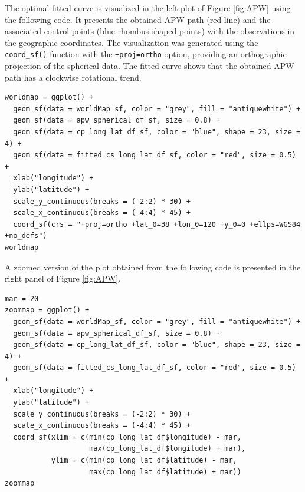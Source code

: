 The optimal fitted curve is visualized in the left plot of Figure \ref{fig:APW} using the following code. It presents the obtained APW path (red line) and the associated control points (blue rhombus-shaped points) with the observations in the geographic coordinates.
The visualization was generated using the \texttt{coord\_sf()} function with the \texttt{+proj=ortho} option, providing an orthographic projection of the spherical data.
The fitted curve shows that the obtained APW path has a clockwise rotational trend.

\begin{verbatim}
worldmap = ggplot() +
  geom_sf(data = worldMap_sf, color = "grey", fill = "antiquewhite") +
  geom_sf(data = apw_spherical_df_sf, size = 0.8) +
  geom_sf(data = cp_long_lat_df_sf, color = "blue", shape = 23, size = 4) +
  geom_sf(data = fitted_cs_long_lat_df_sf, color = "red", size = 0.5) +
  xlab("longitude") +
  ylab("latitude") +
  scale_y_continuous(breaks = (-2:2) * 30) +
  scale_x_continuous(breaks = (-4:4) * 45) +
  coord_sf(crs = "+proj=ortho +lat_0=38 +lon_0=120 +y_0=0 +ellps=WGS84 +no_defs")
worldmap
\end{verbatim}

A zoomed version of the plot obtained from the following code is presented in the right panel of Figure \ref{fig:APW}.

\begin{verbatim}
mar = 20
zoommap = ggplot() +
  geom_sf(data = worldMap_sf, color = "grey", fill = "antiquewhite") +
  geom_sf(data = apw_spherical_df_sf, size = 0.8) +
  geom_sf(data = cp_long_lat_df_sf, color = "blue", shape = 23, size = 4) +
  geom_sf(data = fitted_cs_long_lat_df_sf, color = "red", size = 0.5) +
  xlab("longitude") +
  ylab("latitude") +
  scale_y_continuous(breaks = (-2:2) * 30) +
  scale_x_continuous(breaks = (-4:4) * 45) +
  coord_sf(xlim = c(min(cp_long_lat_df$longitude) - mar,
                    max(cp_long_lat_df$longitude) + mar),
           ylim = c(min(cp_long_lat_df$latitude) - mar,
                    max(cp_long_lat_df$latitude) + mar))
zoommap
\end{verbatim}

